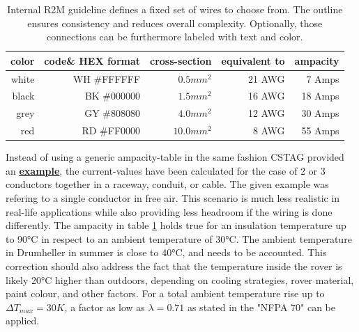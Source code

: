     \begin{table}[h] %
        \centering
        \begin{tabular}{|r|r|r|r|r|} \hline 
          color\footnotemark[1]&  code\footnotemark[2] \& HEX format&  cross-section\footnotemark[3]&  equivalent to&  ampacity\footnotemark[4] \\ \hline 
                          white&          WH \#FFFFFF&                    $0.5mm^2$&                          21 AWG&                 7 Amps    \\ \hline 
                          black&          BK \#000000&                    $1.5mm^2$&                          16 AWG&                18 Amps    \\ \hline 
                           grey&          GY \#808080&                    $4.0mm^2$&                          12 AWG&                30 Amps    \\ \hline 
                            red&          RD \#FF0000&                   $10.0mm^2$&                           8 AWG&                55 Amps    \\ \hline
        \end{tabular}
        \caption{Internal R2M guideline defines a fixed set of wires to choose from. The outline ensures consistency and reduces overall complexity. Optionally, those connections can be furthermore labeled with text and color.}
        \label{color_codes}
    \end{table}

    Instead of using a generic ampacity-table in the same fashion CSTAG provided an \href{https://web.archive.org/web/20230310184047/https://www.coonerwire.com/amp-chart/}{\textbf{\underline{example}}}, the current-values have been calculated for the case of 2 or 3 conductors together in a raceway, conduit, or cable. The given example was refering to a single conductor in free air. This scenario is much less realistic in real-life applications while also providing less headroom if the wiring is done differently. The ampacity in table \ref{color_codes} holds true for an insulation temperature up to 90°C in respect to an ambient temperature of 30°C. The ambient temperature in Drumheller in summer is close to 40°C, and needs to be accounted. This correction should also address the fact that the temperature inside the rover is likely 20°C higher than outdoors, depending on cooling strategies, rover material, paint colour, and other factors. For a total ambient temperature rise up to $\Delta T_{max} = 30K$, a factor as low as $\lambda = 0.71$ as stated in the "NFPA 70" can be applied.

